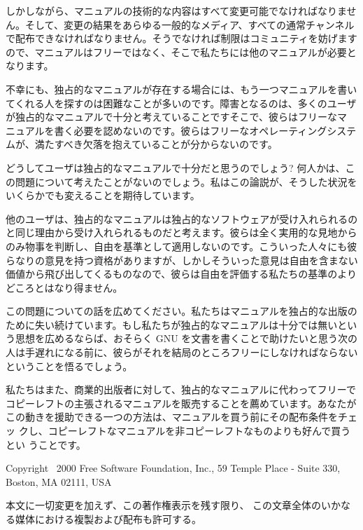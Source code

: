 \begin{multicols}{2}
しかしながら、マニュアルの技術的な内容はすべて変更可能でなければなりませ
ん。そして、変更の結果をあらゆる一般的なメディア、すべての通常チャンネル
で配布できなければなりません。そうでなければ制限はコミュニティを妨げます
ので、マニュアルはフリーではなく、そこで私たちには他のマニュアルが必要と
なります。 

不幸にも、独占的なマニュアルが存在する場合には、もう一つマニュアルを書い
てくれる人を探すのは困難なことが多いのです。障害となるのは、多くのユーザ
が独占的なマニュアルで十分と考えていることです\zdash そこで、彼らはフリーなマ
ニュアルを書く必要を認めないのです。彼らはフリーなオペレーティングシステ
ムが、満たすべき欠落を抱えていることが分からないのです。 

どうしてユーザは独占的なマニュアルで十分だと思うのでしょう? 何人かは、こ
の問題について考えたことがないのでしょう。私はこの論説が、そうした状況を
いくらかでも変えることを期待しています。 

他のユーザは、独占的なマニュアルは独占的なソフトウェアが受け入れられるの
と同じ理由から受け入れられるものだと考えます。彼らは全く実用的な見地から
のみ物事を判断し、自由を基準として適用しないのです。こういった人々にも彼
らなりの意見を持つ資格がありますが、しかしそういった意見は自由を含まない
価値から飛び出してくるものなので、彼らは自由を評価する私たちの基準のより
どころとはなり得ません。 

この問題についての話を広めてください。私たちはマニュアルを独占的な出版の
ために失い続けています。もし私たちが独占的なマニュアルは十分では無いとい
う思想を広めるならば、おそらく GNU を文書を書くことで助けたいと思う次の
人は手遅れになる前に、彼らがそれを結局のところフリーにしなければならない
ということを悟るでしょう。 

私たちはまた、商業的出版者に対して、独占的なマニュアルに代わってフリーで
コピーレフトの主張されるマニュアルを販売することを薦めています。あなたが
この動きを援助できる一つの方法は、マニュアルを買う前にその配布条件をチェッ
クし、コピーレフトなマニュアルを非コピーレフトなものよりも好んで買うとい
うことです。 

\begin{center}
 Copyright \textcopyright\ 2000 Free Software Foundation, Inc., 59
 Temple Place - Suite 330, Boston, MA 02111, USA
\end{center}


本文に一切変更を加えず、この著作権表示を残す限り、 この文章全体のいかな
る媒体における複製および配布も許可する。

\end{multicols}

